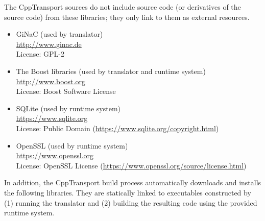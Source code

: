 \documentclass[11pt,a4paper]{article}
\newcommand{\packagefont}{\sffamily}
\newcommand{\GiNaC}{{\packagefont GiNaC}}
\newcommand{\CppTransport}{{\packagefont CppTransport}}
\newcommand{\SQLite}{{\packagefont SQLite}}
\newcommand{\OpenSSL}{{\packagefont OpenSSL}}
\newcommand{\Boost}{{\packagefont Boost}}
\begin{document}
The {\CppTransport} sources do not include source code (or derivatives of the source code)
from these libraries; they only link to them as external resources.    
\begin{itemize}
    \item {\GiNaC} (used by translator) \\
    \url{http://www.ginac.de} \\
    License: GPL-2
    
    \item The {\Boost} libraries (used by translator and runtime system) \\
    \url{http://www.boost.org} \\
    License: Boost Software License
    
    \item {\SQLite} (used by runtime system) \\
    \url{https://www.sqlite.org} \\
    License: Public Domain (\url{https://www.sqlite.org/copyright.html})
    
    \item {\OpenSSL} (used by runtime system) \\
    \url{https://www.openssl.org} \\
    License: OpenSSL License (\url{https://www.openssl.org/source/license.html})
\end{itemize}
In addition, the {\CppTransport} build process automatically downloads
and installs the following libraries. They are statically linked to executables
constructed by (1) running the translator and (2) building the resulting code
using the provided runtime system.
\end{document}
